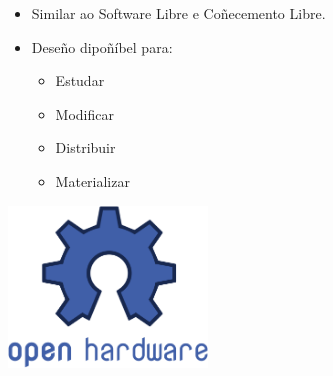\documentclass{beamer}
\begin{document}
\begin{frame}
\begin{itemize}
\item Similar ao Software Libre e Coñecemento Libre.
\item Deseño dipoñíbel para:
\begin{itemize}
 \item Estudar
 \item Modificar
 \item Distribuir
 \item Materializar
\end{itemize}
\end{itemize}

\begin{center}
\includegraphics[width=150pt]{./img/Ohw-logo.png}
\end{center}


\end{frame}
\end{document}
